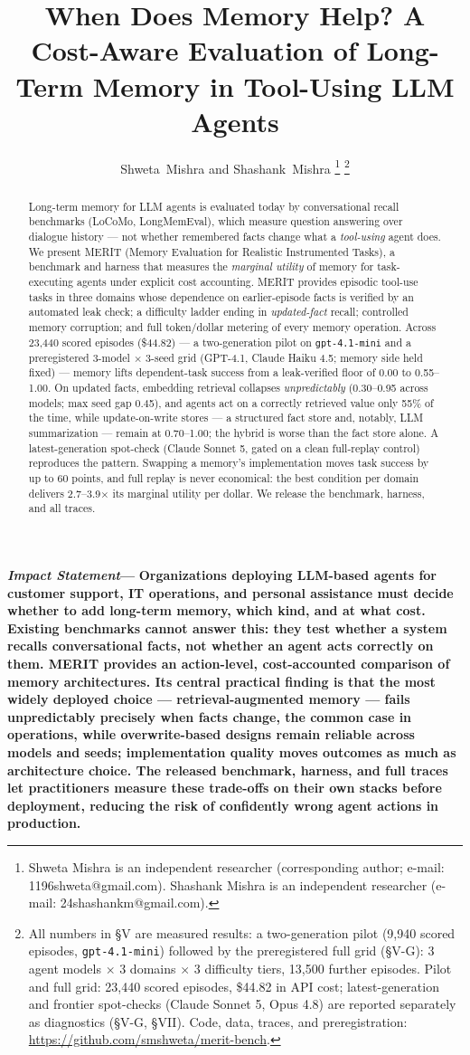 \documentclass[journal]{IEEEtran}
\title{When Does Memory Help? A Cost-Aware Evaluation of Long-Term Memory in Tool-Using LLM Agents}
\author{Shweta~Mishra and Shashank~Mishra%
\thanks{Shweta Mishra is an independent researcher (corresponding author;
e-mail: 1196shweta@gmail.com). Shashank Mishra is an independent
researcher (e-mail: 24shashankm@gmail.com).}%
\thanks{All numbers in \S{}V are measured results: a two-generation pilot
(9{,}940 scored episodes, \texttt{gpt-4.1-mini}) followed by the
preregistered full grid (\S{}V-G): 3 agent models $\times$ 3 domains
$\times$ 3 difficulty tiers, 13{,}500 further episodes. Pilot and full
grid: 23{,}440 scored episodes, \$44.82 in API cost; latest-generation and
frontier spot-checks (Claude Sonnet 5, Opus 4.8) are reported separately
as diagnostics (\S{}V-G, \S{}VII). Code, data, traces, and preregistration:
\url{https://github.com/smshweta/merit-bench}.}}
\newcommand{\merit}{\textsc{MERIT}}
\newenvironment{IEEEImpStatement}%
{\par\addvspace{0.6\baselineskip}\noindent\small%
\textbf{\textit{Impact Statement}---}\bfseries}%
{\par\addvspace{0.6\baselineskip}}}{}
\begin{document}
\maketitle

\begin{abstract}
Long-term memory for LLM agents is evaluated today by conversational recall
benchmarks (LoCoMo, LongMemEval), which measure question answering over
dialogue history --- not whether remembered facts change what a
\emph{tool-using} agent does. We present \merit{} (Memory Evaluation for
Realistic Instrumented Tasks), a benchmark and harness that measures the
\emph{marginal utility} of memory for task-executing agents under explicit
cost accounting. \merit{} provides episodic tool-use tasks in three domains
whose dependence on earlier-episode facts is verified by an automated leak
check; a difficulty ladder ending in \emph{updated-fact} recall; controlled
memory corruption; and full token/dollar metering of every memory
operation. Across 23{,}440 scored episodes (\$44.82) --- a two-generation
pilot on \texttt{gpt-4.1-mini} and a preregistered 3-model $\times$ 3-seed
grid (GPT-4.1, Claude Haiku 4.5; memory side held fixed) --- memory lifts
dependent-task success from a leak-verified floor of 0.00 to 0.55--1.00.
On updated facts, embedding retrieval collapses \emph{unpredictably}
(0.30--0.95 across models; max seed gap 0.45), and agents act on a
correctly retrieved value only 55\% of the time, while update-on-write
stores --- a structured fact store and, notably, LLM summarization ---
remain at 0.70--1.00; the hybrid is worse than the fact store alone. A
latest-generation spot-check (Claude Sonnet 5, gated on a clean
full-replay control) reproduces the pattern. Swapping a memory's
implementation moves task success by up to 60 points, and full replay is
never economical: the best condition per domain delivers
2.7--3.9$\times$ its marginal utility per dollar. We release the
benchmark, harness, and all traces.
\end{abstract}

\begin{IEEEImpStatement}
Organizations deploying LLM-based agents for customer support, IT
operations, and personal assistance must decide whether to add long-term
memory, which kind, and at what cost. Existing benchmarks cannot answer
this: they test whether a system recalls conversational facts, not whether
an agent acts correctly on them. MERIT provides an action-level,
cost-accounted comparison of memory architectures. Its central practical
finding is that the most widely deployed choice --- retrieval-augmented
memory --- fails unpredictably precisely when facts change, the common case
in operations, while overwrite-based designs remain reliable across models
and seeds; implementation quality moves outcomes as much as architecture
choice. The released benchmark, harness, and full traces let practitioners
measure these trade-offs on their own stacks before deployment, reducing
the risk of confidently wrong agent actions in production.
\end{IEEEImpStatement}
\end{document}
